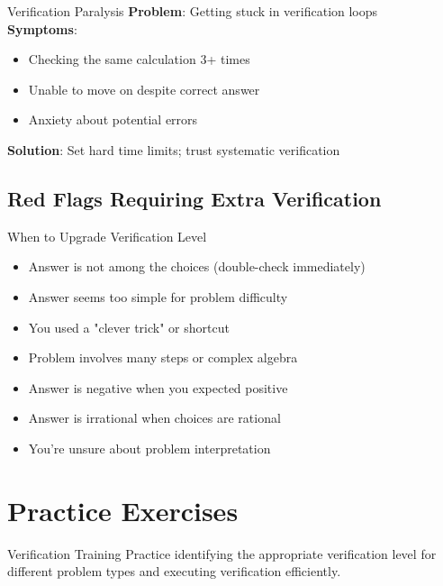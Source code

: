 \documentclass{article}
\begin{document}
\begin{warningbox}{Verification Paralysis}
\textbf{Problem}: Getting stuck in verification loops\\
\textbf{Symptoms}:
\begin{itemize}[nosep]
\item Checking the same calculation 3+ times
\item Unable to move on despite correct answer
\item Anxiety about potential errors
\end{itemize}
\textbf{Solution}: Set hard time limits; trust systematic verification
\end{warningbox}

\subsection{Red Flags Requiring Extra Verification}

\begin{warningbox}{When to Upgrade Verification Level}
\begin{itemize}
\item Answer is not among the choices (double-check immediately)
\item Answer seems too simple for problem difficulty
\item You used a "clever trick" or shortcut
\item Problem involves many steps or complex algebra
\item Answer is negative when you expected positive
\item Answer is irrational when choices are rational
\item You're unsure about problem interpretation
\end{itemize}
\end{warningbox}

\newpage

\section{Practice Exercises}

\begin{strategybox}{Verification Training}
Practice identifying the appropriate verification level for different problem types and executing verification efficiently.
\end{strategybox}
\end{document}

